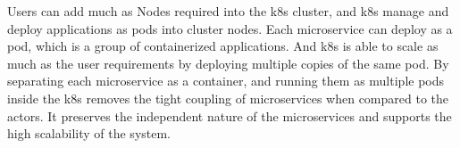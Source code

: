 Users can add much as Nodes required into the \acrshort{k8s} cluster, and \acrshort{k8s} manage and deploy applications as pods into cluster nodes. Each microservice can deploy as a pod, which is a group of containerized applications. And \acrshort{k8s} is able to scale as much as the user requirements by deploying multiple copies of the same pod. By separating each microservice as a container, and running them as multiple pods inside the \acrshort{k8s} removes the tight coupling of microservices when compared to the actors. It preserves the independent nature of the microservices and supports the high scalability of the system.
